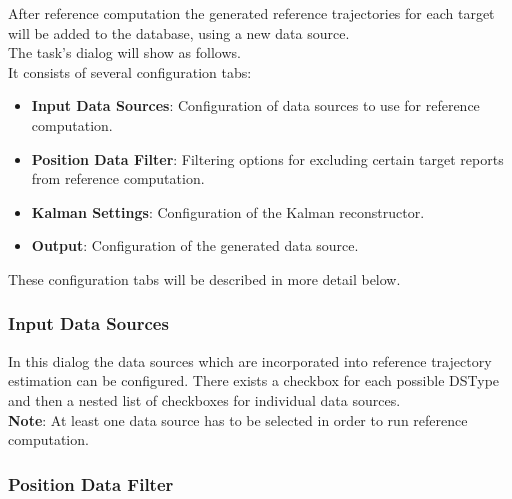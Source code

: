 After reference computation the generated reference trajectories for each target will be added to the database, 
using a new data source. \\

The task's dialog will show as follows. \\


It consists of several configuration tabs:

\begin{itemize}
    \item \textbf{Input Data Sources}: Configuration of data sources to use for reference computation.
    \item \textbf{Position Data Filter}: Filtering options for excluding certain target reports from reference computation.
    \item \textbf{Kalman Settings}: Configuration of the Kalman reconstructor.
    \item \textbf{Output}: Configuration of the generated data source. \\
\end{itemize}

These configuration tabs will be described in more detail below.

\subsubsection{Input Data Sources}


In this dialog the data sources which are incorporated into reference trajectory estimation can be configured.
There exists a checkbox for each possible DSType and then a nested list of checkboxes for individual data sources. \\

\textbf{Note}: At least one data source has to be selected in order to run reference computation.

\subsubsection{Position Data Filter}

